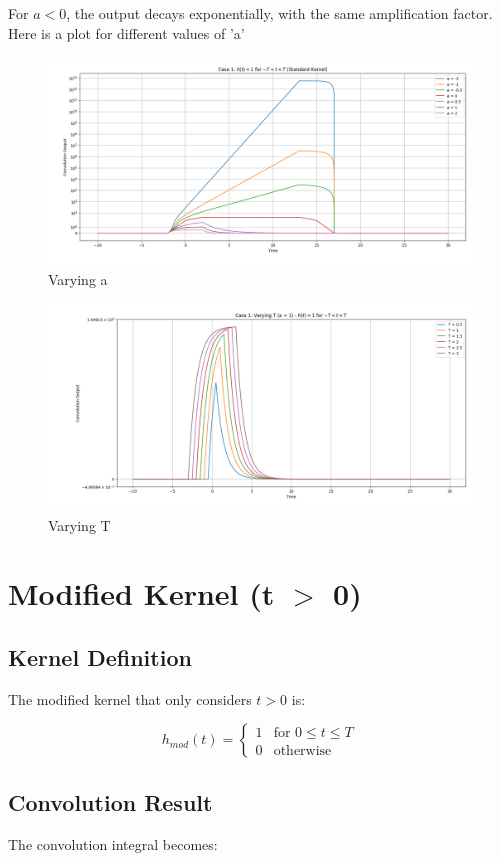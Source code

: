\documentclass[12pt,a4paper,titlepage]{article}
\begin{document}
For $a < 0$, the output decays exponentially, with the same amplification factor. Here is a plot for different values of 'a'
\begin{figure}[H]
    \centering
    \includegraphics[width=0.8\linewidth]{plotseax/standardkernelvaryinga.png}
    \caption{Varying a}
    \label{fig:enter-label}
\end{figure}
\begin{figure}[H]
    \centering
    \includegraphics[width=0.8\linewidth]{plotseax/standardkernelcaryingT.png}
    \caption{Varying T}
    \label{fig:enter-label}
\end{figure}

\section{Modified Kernel (t $>$ 0)}
\subsection{Kernel Definition}
The modified kernel that only considers $t > 0$ is:

\begin{equation}
h_{mod}(t) = 
\begin{cases} 
1 & \text{for } 0 \leq t \leq T \\
0 & \text{otherwise}
\end{cases}
\end{equation}

\subsection{Convolution Result}
The convolution integral becomes:
\end{document}
